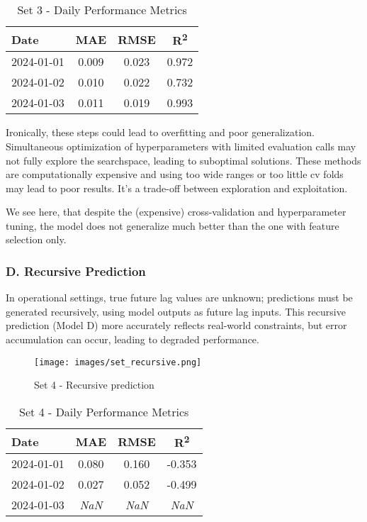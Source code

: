 \begin{table}[H]
    \centering
    \caption{Set 3 - Daily Performance Metrics}
    \begin{tabular}{lccc}
        Date        & MAE    & RMSE   & R\textsuperscript{2} \\
        \hline
        2024-01-01  & 0.009  & 0.023  & 0.972 \\
        2024-01-02  & 0.010  & 0.022  & 0.732 \\
        2024-01-03  & 0.011  & 0.019  & 0.993 \\
    \end{tabular}
\end{table}

Ironically, these steps could lead to overfitting and poor generalization. 
Simultaneous optimization of hyperparameters with limited evaluation 
calls may not fully explore the searchspace, leading to suboptimal solutions. 
These methods are computationally expensive and using too wide ranges or too 
little cv folds may lead to poor results. It's a trade-off between exploration and 
exploitation. 

We see here, that despite the (expensive) cross-validation and hyperparameter tuning, 
the model does not generalize much better than the one with feature selection only. 

\subsubsection*{D. Recursive Prediction}
In operational settings, true future lag values are unknown; predictions must be generated recursively, 
using model outputs as future lag inputs. This recursive prediction (Model D) more accurately reflects 
real-world constraints, but error accumulation can occur, leading to degraded performance.

\begin{figure}[H]
    \centering
    \texttt{[image: images/set\_recursive.png]}
    \caption{Set 4 - Recursive prediction}
    \label{fig:set4-forecast-profile}
\end{figure}

\begin{table}[H]
    \centering
    \begin{tabular}{lccc}
        Date        & MAE    & RMSE   & R\textsuperscript{2} \\
        \hline
        2024-01-01  & 0.080  & 0.160  & -0.353 \\
        2024-01-02  & 0.027  & 0.052  & -0.499 \\
        2024-01-03  & \textit{NaN}    & \textit{NaN}    & \textit{NaN} \\
    \end{tabular}
    \caption{Set 4 - Daily Performance Metrics}
\end{table}

